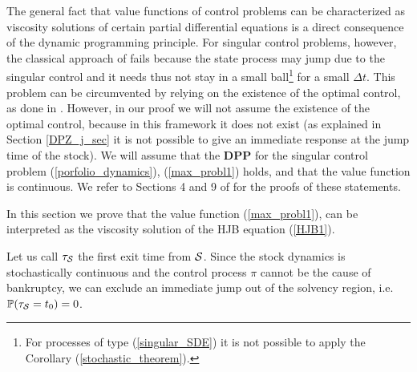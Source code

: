 The general fact that value functions of control problems can be characterized as
viscosity solutions of certain partial differential equations is a direct consequence of the dynamic
programming principle. For singular control problems, however, the classical approach of \cite{PLL83}
fails because the state process may jump due to the singular control and it needs thus not stay
in a small ball\footnote{For processes of type (\ref{singular_SDE}) it is not possible to apply the Corollary (\ref{stochastic_theorem}).} 
for a small $\Delta t$.
This problem can be circumvented by relying on the
existence of the optimal control, as done in \cite{DaPaZa93}. However, in our proof we will not assume the existence of the optimal control, because 
in this framework it does not exist (as explained in Section \ref{DPZ_j_sec} it is not possible to give an immediate response at the jump time of the stock).
We will assume that the \textbf{DPP} for the singular control problem (\ref{porfolio_dynamics}), (\ref{max_probl1}) holds, and that the value function  
is continuous. We refer to Sections 4 and 9 of \cite{Kab16} for the proofs of these statements. 

In this section we prove that the value function (\ref{max_probl1}), can be interpreted 
as the viscosity solution of the HJB equation (\ref{HJB1}).

Let us call $\tau_{\mathcal{S}}$ the first exit time from $\mathcal{S}$.
Since the stock dynamics is stochastically continuous and the control process $\pi$ cannot be the cause of bankruptcy,
we can exclude an immediate jump out of the solvency region, i.e. $\mathbb{P} ( \tau_{\mathcal{S}} = t_0 ) =0$.

